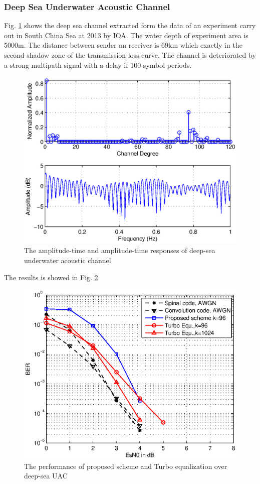 \documentclass[conference]{IEEEtran}
\begin{document}
\subsubsection{Deep Sea Underwater Acoustic Channel}
Fig. \ref{fig_DeepChannel} shows the deep sea channel extracted form the data of an experiment carry out in South China Sea at 2013 by IOA. The water depth of experiment area is 5000m. The distance between sender an receiver is 69km which exactly in the second  shadow zone of  the transmission loss curve. The channel is deteriorated by a strong multipath signal  with a delay if 100 symbol periods.

\begin{figure}[!t]
\centering
\includegraphics[width=3 in]{DeepChannel.eps}
\caption{The amplitude-time and amplitude-time responses of deep-sea underwater acoustic channel}
\label{fig_DeepChannel}
\end{figure}
The results is showed in Fig. \ref{fig_DeepQPSKComparison} 

\begin{figure}[!t]
\centering
\includegraphics[width=3.5 in]{DeepQPSKComparison.eps}
\caption{The performance of proposed scheme and Turbo equalization over deep-sea UAC}
\label{fig_DeepQPSKComparison}
\end{figure}
\end{document}
